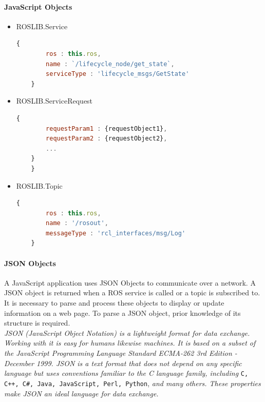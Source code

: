 \paragraph{JavaScript Objects}
\begin{itemize}

\item ROSLIB.Service
\begin{lstlisting}[language=JavaScript,
	label={JavsScript:ROSLIB.Service}
	caption={JavaScript object definition for Service}]
	{
		ros : this.ros,
		name : `/lifecycle_node/get_state`,
		serviceType : 'lifecycle_msgs/GetState'
	}
\end{lstlisting}

\item ROSLIB.ServiceRequest
\begin{lstlisting}[language=JavaScript,
	caption={JavaScript object definition for ServiceRequest}]
	{
		requestParam1 : {requestObject1},
		requestParam2 : {requestObject2},
		...
    }
	}
\end{lstlisting}


\item ROSLIB.Topic
\begin{lstlisting}[language=JavaScript,
	caption={JavaScript object definition for Topic}]
	{
		ros : this.ros,
		name : '/rosout',
		messageType : 'rcl_interfaces/msg/Log'
	}
\end{lstlisting}
\end{itemize}

\paragraph{JSON Objects} A JavaScript application uses JSON Objects to communicate over a network. A JSON object is returned when a ROS service is called or a topic is subscribed to. It is necessary to parse and process these objects to display or update information on a web page. To parse a JSON object, prior knowledge of its structure is required. \\

 \textit{JSON (JavaScript Object Notation) is a lightweight format for data exchange. Working with it is easy for humans likewise machines. It is based on a subset of the JavaScript Programming Language Standard ECMA-262 3rd Edition - December 1999. JSON is a text format that does not depend on any specific language but uses conventions familiar to the C language family, including} \lstinline{C, C++, C#, Java, JavaScript, Perl, Python}, \textit{and many others. These properties make JSON an ideal language for data exchange.}\cite{jsonDef} \\

